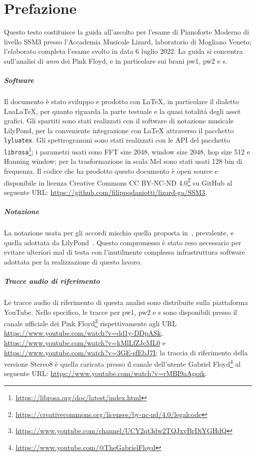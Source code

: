 \documentclass[class=book, crop=false, oneside, 12pt]{standalone}
\begin{document}
\chapter*{Prefazione}

Questo testo costituisce la guida all'ascolto per l'esame di Pianoforte Moderno di livello SSM3 presso l'Accademia Musicale Lizard, laboratorio di Mogliano Veneto; l'elaborato completa l'esame svolto in data 6 luglio 2022. La guida si concentra sull'analisi di \emph{\acrlong{anm}} dei Pink Floyd, e in particolare sui brani \acrlong{pw1}, \acrlong{pw2} e \acrlong{s}.

\paragraph{Software}
Il documento è stato sviluppo e prodotto con LaTeX, in particolare il dialetto LuaLaTeX, per quanto riguarda la parte testuale e la quasi totalità degli asset grafici. Gli spartiti sono stati realizzati con il software di notazione musicale LilyPond, per la conveniente integrazione con LaTeX attraverso il pacchetto \texttt{lyluatex}. Gli spettrogrammi sono stati realizzati con le API del pacchetto \texttt{librosa}\footnote{\url{https://librosa.org/doc/latest/index.html}}; i parametri usati sono FFT size 2048, window size 2048, hop size 512 e Hanning window; per la trasformazione in scala Mel sono stati usati 128 bin di frequenza. Il codice che ha prodotto questo documento è open source e disponibile in licenza Creative Commons CC BY-NC-ND 4.0\footnote{\url{https://creativecommons.org/licenses/by-nc-nd/4.0/legalcode}} su GitHub al seguente URL: \url{https://github.com/filippodaniotti/lizard-ga/SSM3}.

\paragraph{Notazione}
La notazione usata per gli accordi mischia quella proposta in~\cite{brachi2008armonia}, prevalente, e quella adottata da LilyPond~\cite{res:lily-chord-chart}. Questo compromesso è stato reso necessario per evitare ulteriori mal di testa con l'inutilmente complessa infrastruttura software adottata per la realizzazione di questo lavoro.

\paragraph{Tracce audio di riferimento}
Le tracce audio di riferimento di questa analisi sono distribuite sulla piattaforma YouTube. Nello specifico, le tracce per \acrshort{pw1}, \acrshort{pw2} e \acrshort{s} sono disponibili  presso il canale ufficiale dei Pink Floyd\footnote{\url{https://www.youtube.com/channel/UCY2qt3dw2TQJxvBrDiYGHdQ}} rispettivamente agli URL \url{https://www.youtube.com/watch?v=dd1y-DDpASk}, \url{https://www.youtube.com/watch?v=kMlLfZJcML0} e \url{https://www.youtube.com/watch?v=3GE-sfEbJ7I};  la traccia di riferimento della versione Stereo8 è quella caricata presso il canale dell'utente Gabriel Floyd\footnote{\url{https://www.youtube.com/@TheGabrielFloyd}} al seguente URL: \url{https://www.youtube.com/watch?v=rMBI9aApoik}.
\end{document}
